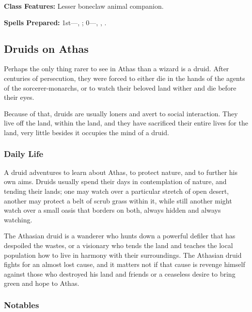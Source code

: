 \textbf{Class Features:} Lesser boneclaw animal companion.

\textbf{Spells Prepared:} 1st---, ; 0---, , .

\subsection{Druids on Athas}

Perhaps the only thing rarer to see in Athas than a wizard is a druid. After centuries of persecution, they were forced to either die in the hands of the agents of the sorcerer-monarchs, or to watch their beloved land wither and die before their eyes.

Because of that, druids are usually loners and avert to social interaction. They live off the land, within the land, and they have sacrificed their entire lives for the land, very little besides it occupies the mind of a druid.

\subsubsection{Daily Life}

A druid adventures to learn about Athas, to protect nature, and to further his own aims. Druids usually spend their days in contemplation of nature, and tending their lands; one may watch over a particular stretch of open desert, another may protect a belt of scrub grass within it, while still another might watch over a small oasis that borders on both, always hidden and always watching.

The Athasian druid is a wanderer who hunts down a powerful defiler that has despoiled the wastes, or a visionary who tends the land and teaches the local population how to live in harmony with their surroundings. The Athasian druid fights for an almost lost cause, and it matters not if that cause is revenge himself against those who destroyed his land and friends or a ceaseless desire to bring green and hope to Athas.

\subsubsection{Notables}

